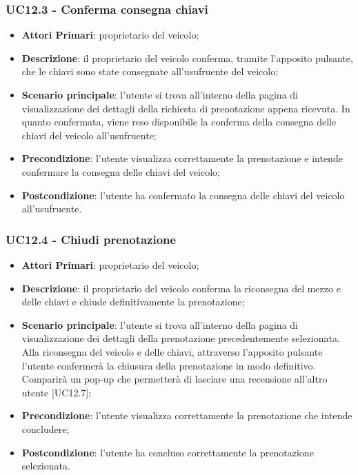 \subsubsection{UC12.3 - Conferma consegna chiavi}
\begin{itemize}
	\item \textbf{Attori Primari}: proprietario del veicolo;
	\item \textbf{Descrizione}: il proprietario del veicolo conferma, tramite l'apposito pulsante, che le chiavi sono state consegnate all'usufruente del veicolo;
	\item \textbf{Scenario principale}: l'utente si trova all'interno della pagina di visualizzazione dei dettagli della richiesta di prenotazione appena ricevuta. In quanto confermata, viene reso disponibile la conferma della consegna delle chiavi del veicolo all'usufruente;
	\item \textbf{Precondizione}: l'utente visualizza correttamente la prenotazione e intende confermare la consegna delle chiavi del veicolo;
	\item \textbf{Postcondizione}: l'utente ha confermato la consegna delle chiavi del veicolo all'usufruente.
\end{itemize}
\subsubsection{UC12.4 - Chiudi prenotazione}
\begin{itemize}
	\item \textbf{Attori Primari}: proprietario del veicolo;
	\item \textbf{Descrizione}: il proprietario del veicolo conferma la riconsegna del mezzo e delle chiavi e chiude definitivamente la prenotazione;
	\item \textbf{Scenario principale}: l'utente si trova all'interno della pagina di visualizzazione dei dettagli della prenotazione precedentemente selezionata. Alla riconsegna del veicolo e delle chiavi, attraverso l'apposito pulsante l'utente confermerà la chiusura della prenotazione in modo definitivo. Comparirà un pop-up che permetterà di lasciare una recensione all'altro utente [UC12.7];
	\item \textbf{Precondizione}: l'utente visualizza correttamente la prenotazione che intende concludere;
	\item \textbf{Postcondizione}: l'utente ha concluso correttamente la prenotazione selezionata.
\end{itemize}
